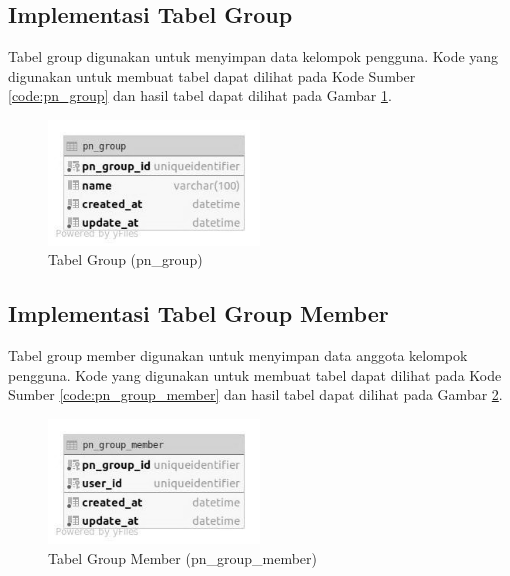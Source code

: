 \subsection{Implementasi Tabel Group}
\par Tabel group digunakan untuk menyimpan data kelompok pengguna. Kode yang digunakan untuk membuat tabel dapat dilihat pada Kode Sumber \ref{code:pn_group} dan hasil tabel dapat dilihat pada Gambar \ref{tabel_pn_group}.

\begin{figure}[H]
	\caption{Tabel Group (pn\_group)}
	\label{tabel_pn_group}
    \centering\includegraphics[width=0.5\textwidth]{bab4/figures/tabel_pn_group.jpg}
\end{figure}

\subsection{Implementasi Tabel Group Member}
\par Tabel group member digunakan untuk menyimpan data anggota kelompok pengguna. Kode yang digunakan untuk membuat tabel dapat dilihat pada Kode Sumber \ref{code:pn_group_member} dan hasil tabel dapat dilihat pada Gambar \ref{tabel_pn_group_member}.

\begin{figure}[H]
	\caption{Tabel Group Member (pn\_group\_member)}
	\label{tabel_pn_group_member}
    \centering\includegraphics[width=0.5\textwidth]{bab4/figures/tabel_pn_group_member.jpg}
\end{figure}

